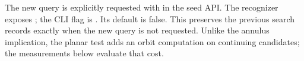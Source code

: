 The new query is explicitly requested with  in the seed
API. The recognizer exposes ; the CLI flag
is . Its default is false. This preserves the
previous search records exactly when the new query is not requested.
Unlike the annulus implication, the planar test adds an orbit computation
on continuing candidates; the measurements below evaluate that cost.


